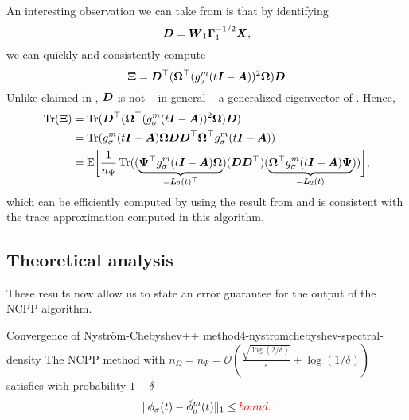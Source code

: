 An interesting observation we can take from 
is that by identifying
\begin{equation}
    \boldsymbol{D} = \boldsymbol{W}_1 \boldsymbol{\Gamma}_1^{-1/2} \boldsymbol{X},
    \label{equ:4-nystromchebyshev-generalized-eigenvector}
\end{equation}
we can quickly and consistently compute
\begin{equation}
    \boldsymbol{\Xi} = \boldsymbol{D}^{\top} (\boldsymbol{\Omega}^{\top} (g_{\sigma}^m(t\boldsymbol{I} - \boldsymbol{A}))^2 \boldsymbol{\Omega}) \boldsymbol{D}
    \label{equ:4-nystromchebyshev-generalized-eigenvector-xi}
\end{equation}
Unlike claimed in \cite[algorithm~4]{lin2017randomized}, $\boldsymbol{D}$ is not -- in general --
a generalized eigenvector of .
Hence,
\begin{align}
    \operatorname{Tr}(\boldsymbol{\Xi})
    &= \operatorname{Tr}(\boldsymbol{D}^{\top} (\boldsymbol{\Omega}^{\top} (g_{\sigma}^m(t\boldsymbol{I} - \boldsymbol{A}))^2 \boldsymbol{\Omega}) \boldsymbol{D}) \notag \\
    &= \operatorname{Tr}( g_{\sigma}^m(t\boldsymbol{I} - \boldsymbol{A}) \boldsymbol{\Omega} \boldsymbol{D} \boldsymbol{D}^{\top} \boldsymbol{\Omega}^{\top} g_{\sigma}^m(t\boldsymbol{I} - \boldsymbol{A})) \notag \\
    &= \mathbb{E}\bigg[\frac{1}{n_{\Psi}} \operatorname{Tr}( (\underbrace{\boldsymbol{\Psi}^{\top} g_{\sigma}^m(t\boldsymbol{I} - \boldsymbol{A}) \boldsymbol{\Omega}}_{=\boldsymbol{L}_2(t)^{\top}})
                                               (\boldsymbol{D} \boldsymbol{D}^{\top})
                                               (\underbrace{\boldsymbol{\Omega}^{\top} g_{\sigma}^m(t\boldsymbol{I} - \boldsymbol{A}) \boldsymbol{\Psi}}_{=\boldsymbol{L}_2(t)})) \bigg],
    \label{equ:4-nystromchebyshev-generalized-eigenvector-trace}
\end{align}
which can be efficiently computed by using the result from 
and is consistent with the trace approximation computed in this algorithm.


\subsection{Theoretical analysis}
\label{subsec:4-nystromchebyshev-analysis}


These results now allow us to state an error guarantee for the output of the
\gls{NCPP} algorithm.
\begin{theorem}{Convergence of Nystr\"om-Chebyshev++ method}{4-nystromchebyshev-spectral-density}
    The \gls{NCPP} method with $n_{\Omega} = n_{\Psi} = \mathcal{O}\left( \frac{\sqrt{\log(2/\delta)}}{\varepsilon} + \log(1/\delta) \right)$
     satisfies with probability $1 - \delta$
    \begin{equation}
        \lVert \phi_{\sigma}(t) - \breve{\phi}_{\sigma}^m(t) \rVert _1 \leq {{\color{red}bound}}.
    \end{equation}
\end{theorem}

